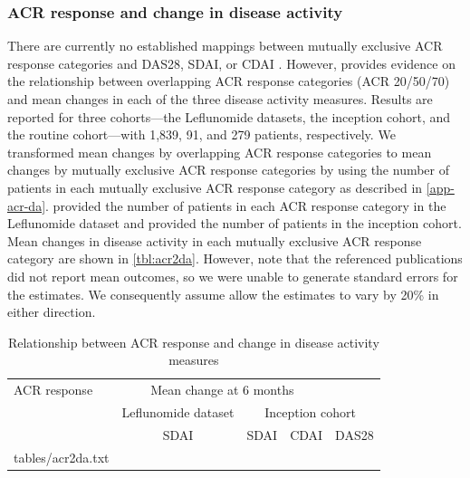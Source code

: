 \documentclass[11pt,final,fleqn]{article}\usepackage[]{graphicx}\usepackage[]{color}
\makeatletter
\theoremstyle{plain}
\newcommand*\ExpandableInput[1]{\@@input#1 }
\makeatother
\begin{document}
\subsubsection{ACR response and change in disease activity}
There are currently no established mappings between mutually exclusive ACR response categories and DAS28, SDAI, or CDAI \citep{madan2015consensus}. However, \citet{aletaha2005simplified} provides evidence on the relationship between overlapping ACR response categories (ACR 20/50/70) and mean changes in each of the three disease activity measures. Results are reported for three cohorts---the Leflunomide datasets, the inception cohort, and the routine cohort---with 1,839, 91, and 279 patients, respectively. We transformed mean changes by overlapping ACR response categories to mean changes by mutually exclusive ACR response categories by using the number of patients in each mutually exclusive ACR response category as described in \autoref{app-acr-da}. \citet{smolen2003simplified} provided the number of patients in each ACR response category in the Leflunomide dataset and \citet{aletaha2005acute} provided the number of patients in the inception cohort. Mean changes in disease activity in each mutually exclusive ACR response category are shown in \autoref{tbl:acr2da}. However, note that the referenced publications did not report mean outcomes, so we were unable to generate standard errors for the estimates. We consequently assume allow the estimates to vary by 20\% in either direction.  



\begin{table}[!ht]
\begin{center}
\begin{threeparttable}
\caption{Relationship between ACR response and change in disease activity measures} \label{tbl:acr2da}
\begin{tabularx}{\textwidth}{@{\extracolsep{\fill}}lcccc}
\hline
\multicolumn{1}{l}{ACR response} &  \multicolumn{3}{c}{Mean change at 6 months}\\
\cmidrule{2-5}
\multicolumn{1}{l}{} & \multicolumn{1}{c}{Leflunomide dataset} & \multicolumn{3}{c}{Inception cohort}\\
\cmidrule(lr){2-2}  \cmidrule(lr){3-5}
\multicolumn{1}{c}{} & \multicolumn{1}{c}{SDAI} & \multicolumn{1}{c}{SDAI} &\multicolumn{1}{c}{CDAI} & \multicolumn{1}{c}{DAS28} \\
\hline
\ExpandableInput{tables/acr2da.txt}
\hline
\end{tabularx}
\scriptsize
\end{threeparttable}
\end{center}
\end{table}
\end{document}

